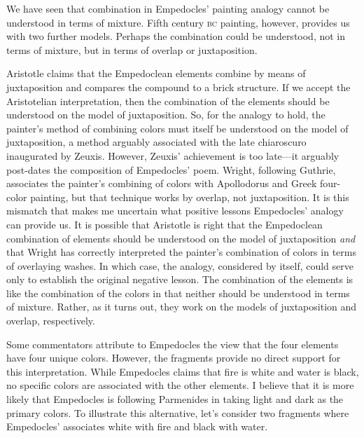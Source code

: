 We have seen that combination in Empedocles' painting analogy cannot be understood in terms of mixture. Fifth century \textsc{bc} painting, however, provides us with two further models. Perhaps the combination could be understood, not in terms of mixture, but in terms of overlap or juxtaposition. 

Aristotle claims that the Empedoclean elements combine by means of juxtaposition and compares the compound to a brick structure. If we accept the Aristotelian interpretation, then the combination of the elements should be understood on the model of juxtaposition. So, for the analogy to hold, the painter's method of combining colors must itself be understood on the model of juxtaposition, a method arguably associated with the late chiaroscuro inaugurated by Zeuxis. However, Zeuxis' achievement is too late---it arguably post-dates the composition of Empedocles' poem. Wright, following Guthrie, associates the painter's combining of colors with Apollodorus and Greek four-color painting, but that technique works by overlap, not juxtaposition. It is this mismatch that makes me uncertain what positive lessons Empedocles' analogy can provide us. It is possible that Aristotle is right that the Empedoclean combination of elements should be understood on the model of juxtaposition \emph{and} that Wright has correctly interpreted the painter's combination of colors in terms of overlaying washes. In which case, the analogy, considered by itself, could serve only to establish the original negative lesson. The combination of the elements is like the combination of the colors in that neither should be understood in terms of mixture. Rather, as it turns out, they work on the models of juxtaposition and overlap, respectively.

Some commentators attribute to Empedocles the view that the four elements have four unique colors. However, the fragments provide no direct support for this interpretation. While Empedocles claims that fire is white and water is black, no specific colors are associated with the other elements. I believe that it is more likely that Empedocles is following Parmenides in taking light and dark as the primary colors. To illustrate this alternative, let's consider two fragments where Empedocles' associates white with fire and black with water. \change


